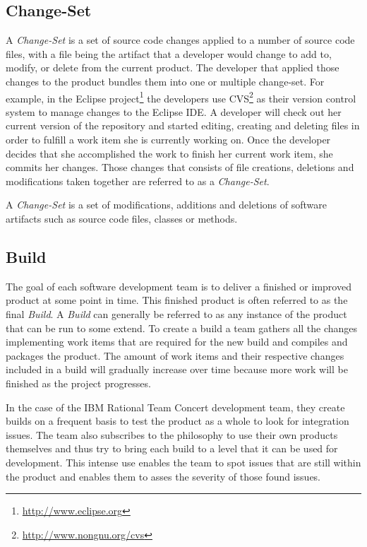 \subsection{Change-Set}
A \emph{Change-Set} is a set of source code changes applied to a number of source code files, with a file being the artifact that a developer would change to add to, modify, or delete from the current product. 
The developer that applied those changes to the product bundles them into one or multiple change-set.
For example, in the Eclipse project\footnote{\url{http://www.eclipse.org}} the developers use CVS\footnote{\url{http://www.nongnu.org/cvs}} as their version control system to manage changes to the Eclipse IDE.
A developer will check out her current version of the repository and started editing, creating and deleting files in order to fulfill a work item she is currently working on.
Once the developer decides that she accomplished the work to finish her current work item, she commits her changes.
Those changes that consists of file creations, deletions and modifications taken together are referred to as a \emph{Change-Set}. 

\begin{note}
\begin{mydef}
A \emph{Change-Set} is a set of modifications, additions and deletions of software artifacts such as source code files, classes or methods.
\end{mydef}
\end{note}

\subsection{Build}
The goal of each software development team is to deliver a finished or improved product at some point in time.
This finished product is often referred to as the final \emph{Build}.
A \emph{Build} can generally be referred to as any instance of the product that can be run to some extend.
To create a build a team gathers all the changes implementing work items that are required for the new build and compiles and packages the product.
The amount of work items and their respective changes included in a build will gradually increase over time because more work will be finished as the project progresses.

In the case of the IBM Rational Team Concert development team, they create builds on a frequent basis to test the product as a whole to look for integration issues. 
The team also subscribes to the philosophy to use their own products themselves and thus try to bring each build to a level that it can be used for development.
This intense use enables the team to spot issues that are still within the product and enables them to asses the severity of those found issues.

